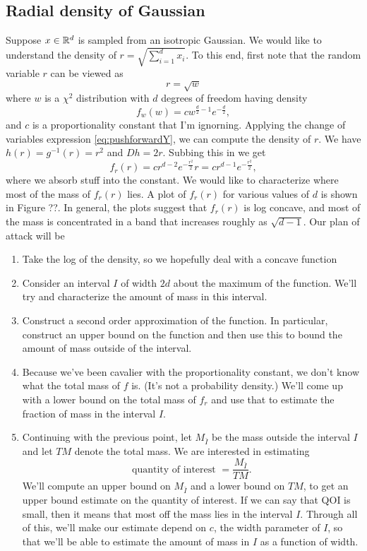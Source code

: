 \subsection{Radial density of Gaussian}
Suppose $x\in \mathbb{R}^d$ is sampled from an isotropic Gaussian. We would like to understand the density of $r= \sqrt{\sum_{i=1}^d x_i}$. To this end, first note that the random variable $r$ can be viewed as 
$$
r = \sqrt{w} 
$$
where $w$ is a $\chi^2$ distribution with $d$ degrees of freedom having density
$$
f_w(w) = cw^{\frac{d}{2} - 1}e^{-\frac{d}{2}},
$$
and $c$ is a proportionality constant that I'm ignorning.
Applying the change of variables expression \eqref{eq:pushforwardY}, we can compute the density of $r$. We have $h(r) = g^{-1}(r) = r^2$ and $Dh = 2r$. Subbing this in we get
$$
f_r(r) = cr^{d - 2}e^{-\frac{r^2}{2}}r = cr^{d-1}e^{-\frac{r^2}{2}}, 
$$
where we absorb stuff into the constant. 
We would like to characterize where most of the mass of $f_r(r)$ lies. A plot of $f_r(r)$ for various values of $d$ is shown in Figure ??. In general, the plots suggest that $f_r(r)$ is log concave, and most of the mass is concentrated in a band that increases roughly as $\sqrt{d-1}$. Our plan of attack will be 
\begin{enumerate}
 \item Take the log of the density, so we hopefully deal with a concave function
 \item Consider an interval $I$ of width $2d$ about the maximum of the function. We'll try and characterize the amount of mass in this interval. 
 \item Construct a second order approximation of the function. In particular, construct an upper bound on the function and then use this to bound the amount of mass outside of the interval. 
 \item Because we've been cavalier with the proportionality constant, we don't know what the total mass of $f$ is. (It's not a probability density.) We'll come up with a lower bound on the total mass of $f_r$ and use that to estimate the fraction of mass in the interval $I$. 
 \item Continuing with the previous point, let $M_{\bar I}$ be the mass outside the interval $I$ and let $TM$ denote the total mass. We are interested in estimating
 $$
 \mbox{quantity of interest } = \frac{M_{\bar I}}{TM}.
 $$
We'll compute an upper bound on $M_{\bar I}$ and a lower bound on $TM$, to get an upper bound estimate on the quantity of interest. If we can say that QOI is small, then it means that most off the mass lies in the interval $I$. Through all of this, we'll make our estimate depend on $c$, the width parameter of $I$, so that we'll be able to estimate the amount of mass in $I$ as a function of width. 
\end{enumerate}

